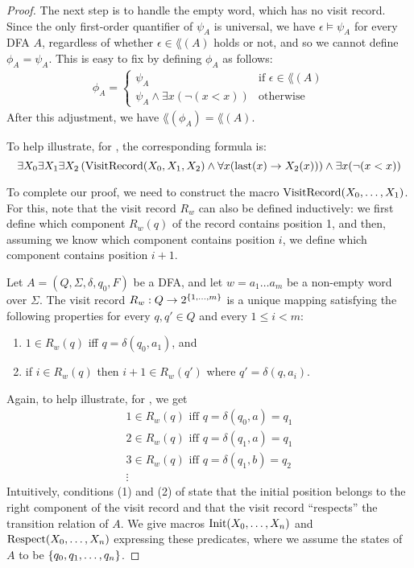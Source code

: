 \documentclass[11pt,twoside=off,numbers=noenddot]{scrbook}
\begin{document}
\begin{proof}
  The next step is to handle the empty word, which has no visit record. Since the only first-order quantifier of $\psi_A$ is universal, we have $\epsilon \models \psi_A$ for every DFA $A$, regardless of whether $\epsilon \in \lang(A)$ holds or not, and so we cannot define $\phi_A = \psi_A$. This is easy to fix by defining $\phi_A$ as follows:
  \begin{align*}
    \phi_A =
    \begin{cases}
      \psi_A & \text{if $\epsilon \in \lang(A)$} \\
      \psi_A \wedge \exists x (\neg (x < x)) & \text{otherwise}
    \end{cases}
  \end{align*}
  After this adjustment, we have $\lang(\phi_A) = \lang(A)$.

  To help illustrate, for , the corresponding formula is:
  \[ \exists X_0 \exists X_1 \exists X_2 \left( \text{VisitRecord}(X_0, X_1, X_2) \wedge \forall x (\text{last}(x) \rightarrow X_2(x)) \right) \wedge \exists x (\neg (x < x)) \]

  To complete our proof, we need to construct the macro $\text{VisitRecord}(X_0, \dots, X_1)$. For this, note that the visit record $R_w$ can also be defined inductively: we first define which component $R_w(q)$ of the record contains position 1, and then, assuming we know which component contains position $i$, we define which component contains position $i + 1$.

  \begin{proposition}
    Let $A = (Q, \Sigma, \delta, q_0, F)$ be a DFA, and let $w = a_1 \dots a_m$ be a non-empty word over $\Sigma$. The visit record $R_w : Q \to 2^{\{ 1, \dots, m \}}$ is a unique mapping satisfying the following properties for every $q, q' \in Q$ and every $1 \leq i < m$:
    \begin{enumerate}
      \item $1 \in R_w(q)$ iff $q = \delta(q_0, a_1)$, and
      \item if $i \in R_w(q)$ then $i + 1 \in R_w(q')$ where $q' = \delta(q, a_i)$.
    \end{enumerate}
  \end{proposition}

  Again, to help illustrate, for , we get
  \begin{gather*}
    \text{$1 \in R_w(q)$ iff $q = \delta(q_0, a) = q_1$} \\
    \text{$2 \in R_w(q)$ iff $q = \delta(q_1, a) = q_1$} \\
    \text{$3 \in R_w(q)$ iff $q = \delta(q_1, b) = q_2$} \\
    \vdots
  \end{gather*}
  Intuitively, conditions (1) and (2) of  state that the initial position belongs to the right component of the visit record and that the visit record ``respects'' the transition relation of $A$. We give macros $\text{Init}(X_0, \dots, X_n)$ and $\text{Respect}(X_0, \dots, X_n)$ expressing these predicates, where we assume the states of $A$ to be $\{ q_0, q_1, \dots, q_n \}$.


\end{proof}
\end{document}
